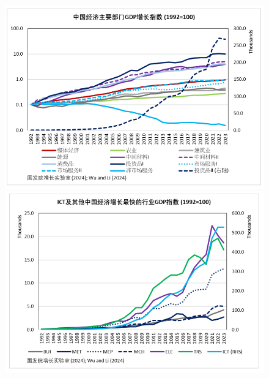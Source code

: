 \begin{figure}[htbp]
  \centering
  \begin{minipage}[t]{0.35\textwidth}
    \includegraphics[width=\linewidth]{image/中国经济主要部门增长指数.png}
  \end{minipage}
    \begin{minipage}[t]{0.35\textwidth}
    \includegraphics[width=\linewidth]{image/ICT引领行业增长.png}
  \end{minipage}
\end{figure}



